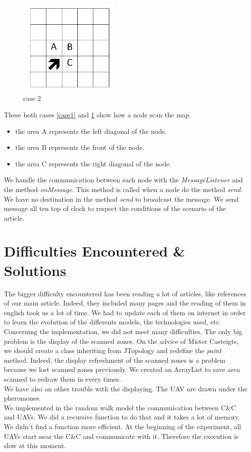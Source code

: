 \begin{figure}[!h]
\center
\includegraphics[width=5cm]{../images/grille_case_2.png}
\caption{\label{case2}case 2}
\end{figure}

These both cases \ref{case1} and \ref{case2} show how a node scan the map.

\begin{itemize}
\item the area A represents the left diagonal of the node.
\item the area B represents the front of the node.
\item the area C represents the right diagonal of the node.
\end{itemize}

We handle the communication between each node with the \textit{MessageListener} and the method \textit{onMessage}. This method is called when a node do the method \textit{send}. We have no destination in the method \textit{send} to broadcast the message. We send message all ten top of clock to respect the conditions of the scenario of the article.

\section{Difficulties Encountered \& Solutions}

The bigger difficulty encountered has been reading a lot of articles, like references of our main article. Indeed, they included many pages and the reading of them in english took us a lot of time. We had to update each of them on internet in order to learn the evolution of the differents models, the technologies used, etc.\\

Concerning the implementation, we did not meet many difficulties. The only big problem is the display of the scanned zones. On the advice of Mister Casteigts, we should create a class inheriting from JTopology and redefine the \textit{paint} method. Indeed, the display refreshment of the scanned zones is a problem because we lost scanned zones previously. We created an ArrayList to save area scanned to redraw them in every times.\\

We have also an other trouble with the displaying. The UAV are drawn under the pheromones.\\

We implemented in the random walk model the communication between C\&C and UAVs. We did a recursive function to do that and it takes a lot of memory. We didn't find a function more efficient. At the beginning of the experiment, all UAVs start near the C\&C and communicate with it. Therefore the execution is slow at this moment.